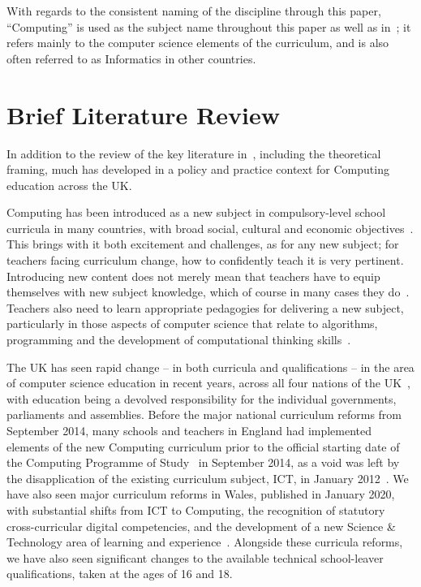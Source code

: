 \documentclass[]{interact}
\theoremstyle{plain}%
\theoremstyle{definition}
\theoremstyle{remark}
\begin{document}
{With regards to the consistent naming of the discipline through this
paper, ``Computing'' is used as the subject name throughout this paper
as well as in~\citet{sentance+csizmadia:2017}; it refers mainly to the
computer science elements of the curriculum, and is also often
referred to as Informatics in other countries.

\section{Brief Literature Review}

In addition to the review of the key literature
in~\citet{sentance+csizmadia:2017}, including the theoretical framing,
much has developed in a policy and practice context for Computing
education across the UK.

Computing has been introduced as a new subject in compulsory-level
school curricula in many countries, with broad social, cultural and
economic objectives~\citep{tuomi-et-al:2018}. This brings with it both
excitement and challenges, as for any new subject; for teachers facing
curriculum change, how to confidently teach it is very
pertinent. Introducing new content does not merely mean that teachers
have to equip themselves with new subject knowledge, which of course
in many cases they
do~\citep{brown-et-al-sigcse2013,sentance-et-al:2013,thompson+bell:2013,sentance+humphreys:2017}.
Teachers also need to learn appropriate pedagogies for delivering a
new subject, particularly in those aspects of computer science that
relate to algorithms, programming and the development of computational
thinking
skills~\citep{davenport-et-al:latice2016,murphy-et-al:programming2017,kong-et-el:2020}.

The UK has seen rapid change -- in both curricula and qualifications
-- in the area of computer science education in recent years, across
all four nations of the
UK~\citep{brown-et-al-sigcse2013,brown-et-al-toce2014,cutts-et-al:2017,moller+crick:jce2018},
with education being a devolved responsibility for the individual
governments, parliaments and assemblies. Before the major national
curriculum reforms from September 2014, many schools and teachers in
England had implemented elements of the new Computing curriculum prior
to the official starting date of the Computing Programme of
Study~\citep{dfecomputingpos:2013} in September 2014, as a void was
left by the disapplication of the existing curriculum subject, ICT, in
January 2012~\citep{brown-et-al-toce2014}. We have also seen major
curriculum reforms in Wales, published in January 2020, with
substantial shifts from ICT to Computing, the recognition of statutory
cross-curricular digital competencies, and the development of a new
Science \& Technology area of learning and
experience~\citep{cfw:2020}. Alongside these curricula reforms, we
have also seen significant changes to the available technical
school-leaver qualifications, taken at the ages of 16 and 18.

}
\end{document}
